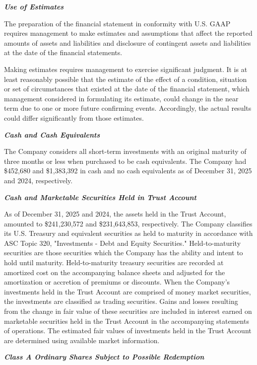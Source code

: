 \documentclass[11pt,a4paper]{article}
\begin{document}
\textit{\textbf{Use of Estimates}}

The preparation of the financial statement in conformity with U.S. GAAP requires management to make estimates and assumptions that affect the reported amounts of assets and liabilities and disclosure of contingent assets and liabilities at the date of the financial statements.

Making estimates requires management to exercise significant judgment. It is at least reasonably possible that the estimate of the effect of a condition, situation or set of circumstances that existed at the date of the financial statement, which management considered in formulating its estimate, could change in the near term due to one or more future confirming events. Accordingly, the actual results could differ significantly from those estimates.

\textit{\textbf{Cash and Cash Equivalents}}

The Company considers all short-term investments with an original maturity of three months or less when purchased to be cash equivalents. The Company had \$452,680 and \$1,383,392 in cash and no cash equivalents as of December 31, 2025 and 2024, respectively.

\textit{\textbf{Cash and Marketable Securities Held in Trust Account}}

As of December 31, 2025 and 2024, the assets held in the Trust Account, amounted to \$241,230,572 and \$231,643,853, respectively. The Company classifies its U.S. Treasury and equivalent securities as held to maturity in accordance with ASC Topic 320, "Investments - Debt and Equity Securities." Held-to-maturity securities are those securities which the Company has the ability and intent to hold until maturity. Held-to-maturity treasury securities are recorded at amortized cost on the accompanying balance sheets and adjusted for the amortization or accretion of premiums or discounts. When the Company's investments held in the Trust Account are comprised of money market securities, the investments are classified as trading securities. Gains and losses resulting from the change in fair value of these securities are included in interest earned on marketable securities held in the Trust Account in the accompanying statements of operations. The estimated fair values of investments held in the Trust Account are determined using available market information.

\textit{\textbf{Class A Ordinary Shares Subject to Possible Redemption}}
\end{document}
